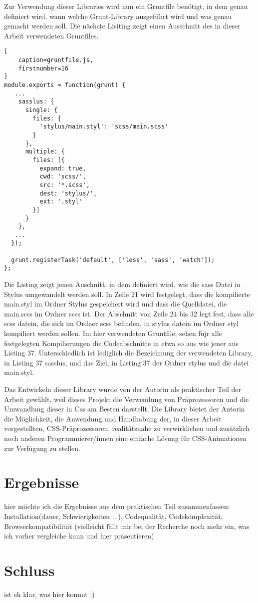 Zur Verwendung dieser Libraries wird nun ein Gruntfile benötigt, in dem genau definiert wird, wann welche Grunt-Library ausgeführt wird und was genau gemacht werden soll. Die nächste Lisiting zeigt einen Ausschnitt des in dieser Arbeit verwendeten Gruntfiles.
\begin{lstlisting}[
	caption=gruntfile.js,
	firstnumber=16
]
module.exports = function(grunt) {
   ...
    sasslus: {
      single: {
        files: {
          'stylus/main.styl': 'scss/main.scss'
        }
      },
      multiple: {
        files: [{
          expand: true,
          cwd: 'scss/',
          src: '*.scss',
          dest: 'stylus/',
          ext: '.styl'
        }]
      }
    },
   ...
  });

  grunt.registerTask('default', ['less', 'sass', 'watch']);
};
\end{lstlisting}
Die Listing zeigt jenen Auschnitt, in dem definiert wird, wie die sass Datei in Stylus umgewandelt werden soll. In Zeile 21 wird festgelegt, dass die kompilierte main.styl im Ordner Stylus gespeichert wird und dass die Quelldatei, die main.scss im Ordner scss ist.\newline
Der Abschnitt von Zeile 24 bis 32 legt fest, dass alle scss datein, die sich im Ordner scss befinden, in stylus datein im Ordner styl kompiliert werden sollen.\newline
Im hier verwendeten Gruntfile, sehen füjr alle festgelegten Kompilierungen die Codeabschnitte in etwa so aus wie jener aus Listing 37. Unterschiedlich ist lediglich die Bezeichnung der verwendeten Library, in Listing 37 sasslus, und das Ziel, in Listing 37 der Ordner stylus und die datei main.styl.

Das Entwickeln dieser Library wurde von der Autorin als praktischer Teil der Arbeit gewählt, weil dieses Projekt die Verwendung von Präprozessoren und die Umwandlung dieser in Css am Besten darstellt. \newline
Die Library bietet der Autorin die Möglichkeit, die Anwendung und Handhabung der, in dieser Arbeit vorgestellten, CSS-Präprozessoren, realitätsnahe zu verwirklichen und zusätzlich noch anderen Programmierer/innen eine einfache Lösung für CSS-Animationen zur Verfügung zu stellen.\newline
\newpage
\section{Ergebnisse}
hier möchte ich die Ergebnisse aus dem praktischen Teil zusammenfassen: Installation(dauer, Schwierigkeiten ...), Codequalität, Codekomplexität, Browserkompatibilität (vielleicht fällt mir bei der Recherche noch mehr ein, was ich vorher vergleiche kann und hier präsentieren)

\section{Schluss}
ist eh klar, was hier kommt ;)




